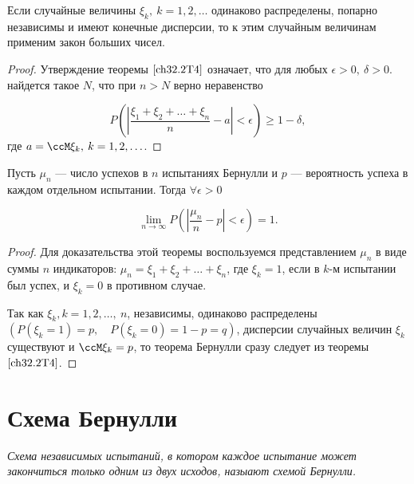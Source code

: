 \begin{thm} \label{ch32.2T4}
Если случайные величины $\xi_k, \: k = 1,2,\ldots$ одинаково распределены, попарно независимы и имеют конечные дисперсии, то к этим случайным величинам применим закон больших чисел.
\end{thm}

\begin{proof}
Утверждение теоремы $\eqref{ch32.2T4}$ означает, что для любых $\epsilon > 0, \: \delta > 0$. найдется такое $N$, что при $n > N$ верно неравенство

\begin{equation} \label{ch32.2eq6}
P \left( \left| \frac{\xi_1 + \xi_2 + \ldots + \xi_n}{n} - a \right| < \epsilon \right) \ge 1 - \delta,
\end{equation}
где $a = \ccM \xi_k, \: k = 1, 2, \ldots$.
\end{proof}

\begin{thm} 
Пусть $\mu_n$ --- число успехов в $n$ испытаниях Бернулли и $p$ --- вероятность успеха в каждом отдельном испытании. Тогда $\forall \epsilon > 0$

\begin{equation} \label{ch32.2eq7}
\lim_{n \to \infty} P \left( \left| \frac{\mu_n}{n} - p \right| < \epsilon \right) = 1.
\end{equation}
\end{thm}

\begin{proof}
Для доказательства этой теоремы воспользуемся представлением $\mu_n$ в виде суммы $n$ индикаторов: $\mu_n = \xi_1 + \xi_2 + \ldots + \xi_n$, где $\xi_k = 1$, если в $k$-м испытании был успех, и $\xi_k  = 0$ в противном случае.

Так как $\xi_k, k = 1,2,\ldots, \: n$, независимы, одинаково распределены $(P( \xi_k = 1) = p, \quad P( \xi_k = 0) = 1 - p = q)$, дисперсии случайных величин $\xi_k$ существуют и $\ccM \xi_k = p$, то теорема Бернулли сразу следует из теоремы $\eqref{ch32.2T4}$.
\end{proof}

\section{Схема Бернулли}

\textit{Схема независимых испытаний, в котором каждое испытание может закончиться только одним из двух исходов, назыают схемой Бернулли.}

